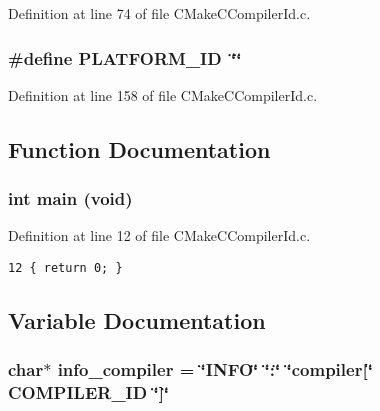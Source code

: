 Definition at line 74 of file CMakeCCompilerId.c.
\subsubsection{\setlength{\rightskip}{0pt plus 5cm}\#define PLATFORM\_\-ID~\char`\"{}\char`\"{}}\label{CMakeCCompilerId_8c_dbc5372f40838899018fadbc89bd588b}




Definition at line 158 of file CMakeCCompilerId.c.

\subsection{Function Documentation}
\subsubsection{\setlength{\rightskip}{0pt plus 5cm}int main (void)}\label{CMakeCCompilerId_8c_e66f6b31b5ad750f1fe042a706a4e3d4}




Definition at line 12 of file CMakeCCompilerId.c.

\begin{Code}\begin{verbatim}12 { return 0; }
\end{verbatim}
\end{Code}




\subsection{Variable Documentation}
\subsubsection{\setlength{\rightskip}{0pt plus 5cm}char$\ast$ {\bf info\_\-compiler} = \char`\"{}INFO\char`\"{} \char`\"{}:\char`\"{} \char`\"{}compiler[\char`\"{} COMPILER\_\-ID \char`\"{}]\char`\"{}}\label{CMakeCCompilerId_8c_ab4f0400f2b990cc0cfaa596066ed23a}




